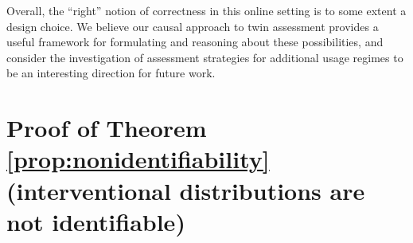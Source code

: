 



Overall, the ``right'' notion of correctness in this online setting is to some extent a design choice.
We believe our causal approach to twin assessment provides a useful framework for formulating and reasoning about these possibilities, and consider the investigation of assessment strategies for additional usage regimes to be an interesting direction for future work.

\section{Proof of Theorem \ref{prop:nonidentifiability} (interventional distributions are not identifiable)} \label{sec:non-identifiability-result-proof-supp}

